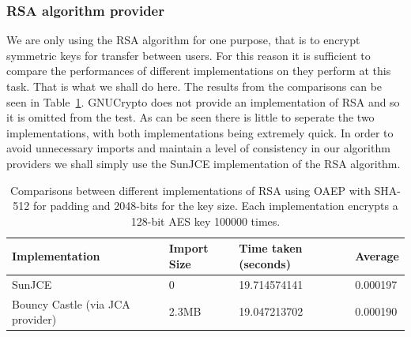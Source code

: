 \documentclass[12pt, titlepage]{article}
\begin{document}
\subsubsection{RSA algorithm provider}
We are only using the RSA algorithm for one purpose, that is to encrypt symmetric keys for transfer between users. For this reason it is sufficient to compare the performances of different implementations on they perform at this task. That is what we shall do here.
\newline \indent The results from the comparisons can be seen in Table~\ref{tab:rsaComparison}. GNUCrypto does not provide an implementation of RSA and so it is omitted from the test. As can be seen there is little to seperate the two implementations, with both implementations being extremely quick.
\newline \indent In order to avoid unnecessary imports and maintain a level of consistency in our algorithm providers we shall simply use the SunJCE implementation of the RSA algorithm.

\begin{center}
\begin{table}[h!]
    \begin{tabular}{ | l | l | l | l |}
    \hline
    Implementation & Import Size & Time taken (seconds) & Average \\ \hline
    
    SunJCE & 0 & 19.714574141  & 0.000197 \\ \hline
    
     Bouncy Castle (via JCA provider) & 2.3MB & 19.047213702 & 0.000190 \\ \hline
    
    \end{tabular}
    \caption{Comparisons between different implementations of RSA using OAEP with SHA-512 for padding and 2048-bits for the key size. Each implementation encrypts a 128-bit AES key 100000 times.} \label{tab:rsaComparison}
    \end{table}
\end{center}
\end{document}

